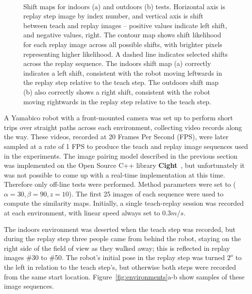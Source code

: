 \documentclass[twocolumn, 9pt,fleqn]{jsproceedings}
\begin{document}
\begin{figure}[t]
\\
\caption{Shift maps for indoors (a) and outdoors (b) tests. Horizontal axis is replay step image by index number, and vertical axis is shift between teach and replay images -- positive values indicate left shift, and negative values, right. The contour map shows shift likelihood for each replay image across all possible shifts, with brighter pixels representing higher likelihood. A dashed line indicates selected shifts across the replay sequence. The indoors shift map (a) correctly indicates a left shift, consistent with the robot moving leftwards in the replay step relative to the teach step. The outdoors shift map (b) also correctly shows a right shift, consistent with the robot moving rightwards in the replay step relative to the teach step.}
\label{fig:shift_maps}
\end{figure}

A Yamabico robot with a front-mounted camera was set up to perform short trips over straight paths across each environment, collecting video records along the way. These videos, recorded at 20 Frames Per Second (FPS), were later sampled at a rate of 1 FPS to produce the teach and replay image sequences used in the experiments. The image pairing model described in the previous section was implemented on the Open Source C++ library \textbf{Cight}~\cite{HEL14c}, but unfortunately it was not possible to come up with a real-time implementation at this time. Therefore only off-line tests were performed. Method parameters were set to ($\alpha = 30, \beta = 90, z = 10$). The first 25 images of each sequence were used to compute the similarity maps. Initially, a single teach-replay session was recorded at each environment, with linear speed always set to $0.3m/s$.

The indoors environment was deserted when the teach step was recorded, but during the replay step three people came from behind the robot, staying on the right side of the field of view as they walked away; this is reflected in replay images \#30 to \#50. The robot's initial pose in the replay step was turned $2^o$ to the left in relation to the teach step's, but otherwise both steps were recorded from the same start location. Figure~\ref{fig:environments}a-b show samples of these image sequences.
\end{document}
